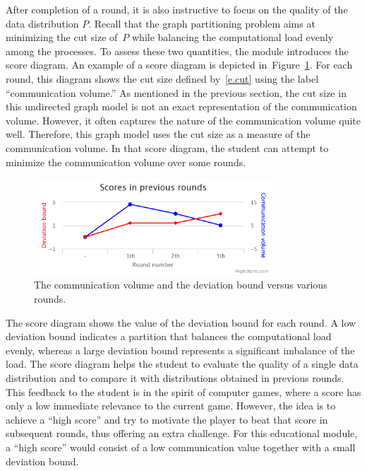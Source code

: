 \documentclass[12pt, twoside,a4paper,toc=bibliography]{scrbook}
\newcommand{\figref}[1]{Figure~\protect\ref{#1}}
\begin{document}
After completion of a round, it is also instructive to focus on the quality of the data
distribution $P$. Recall that the graph partitioning problem aims at minimizing the cut
size of~$P$ while balancing the computational load evenly among the processes. To assess
these two quantities, the module introduces the score diagram. An example of a score
diagram is depicted in~\figref{f.score}. For each round, this diagram shows the cut size
defined by~\eqref{e.cut} using the label ``communication volume.'' As mentioned in the
previous section, the cut size in this undirected graph model is not an exact
representation of the communication volume. However, it often captures the nature of the
communication volume quite well. Therefore, this graph model uses the cut size as a
measure of the communication volume. In that score diagram, the student can attempt to minimize the communication volume over some rounds.

\begin{figure}
\centering
\includegraphics[width=0.8\textwidth]{chart}
\caption{The communication volume and the deviation bound versus various rounds.}
\label{f.score}
\end{figure}
The score diagram shows the value of the deviation bound for each round. A low deviation bound
indicates a partition that balances the computational load evenly, whereas a large
deviation bound represents a significant imbalance of the load. The score diagram helps the
student to evaluate the quality of a single data distribution and to compare it with
distributions obtained in previous rounds. This feedback to the student is in
the spirit of computer games, where a score has only a low immediate relevance to the
current game. However, the idea is to achieve a ``high score'' and try to motivate the
player to beat that score in subsequent rounds, thus offering an extra challenge. For
this educational module, a ``high score'' would consist of a low communication value
together with a small deviation bound.
\end{document}
